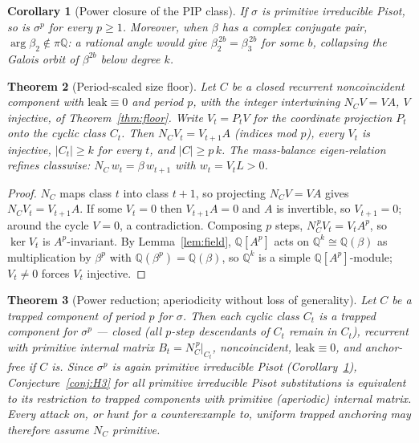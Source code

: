 \documentclass[11pt]{article}
\newtheorem{theorem}{Theorem}[section]
\newtheorem{corollary}[theorem]{Corollary}
\begin{document}
\begin{corollary}[Power closure of the PIP class]\label{cor:power}
If $\sigma$ is primitive irreducible Pisot, so is $\sigma^p$ for every
$p\ge1$. Moreover, when $\beta$ has a complex conjugate pair,
$\arg\beta_2\notin\pi\mathbb{Q}$: a rational angle would give
$\beta_2^{\,2b}=\beta_3^{\,2b}$ for some $b$, collapsing the Galois
orbit of $\beta^{2b}$ below degree $k$.
\end{corollary}

\begin{theorem}[Period-scaled size floor]\label{thm:periodfloor}
Let $C$ be a closed recurrent noncoincident component with
$\mathrm{leak}\equiv0$ and period $p$, with the integer intertwining
$N_CV=VA$, $V$ injective, of Theorem~\ref{thm:floor}. Write
$V_t=P_tV$ for the coordinate projection $P_t$ onto the cyclic class
$C_t$. Then $N_CV_t=V_{t+1}A$ (indices mod $p$), every $V_t$ is
injective, $|C_t|\ge k$ for every $t$, and $|C|\ge p\,k$. The
mass-balance eigen-relation refines classwise:
$N_C\,w_t=\beta\,w_{t+1}$ with $w_t=V_tL>0$.
\end{theorem}

\begin{proof}
$N_C$ maps class $t$ into class $t+1$, so projecting $N_CV=VA$ gives
$N_CV_t=V_{t+1}A$. If some $V_t=0$ then $V_{t+1}A=0$ and $A$ is
invertible, so $V_{t+1}=0$; around the cycle $V=0$, a contradiction.
Composing $p$ steps, $N_C^{\,p}V_t=V_tA^p$, so $\ker V_t$ is
$A^p$-invariant. By Lemma~\ref{lem:field}, $\mathbb{Q}[A^p]$ acts on
$\mathbb{Q}^k\cong\mathbb{Q}(\beta)$ as multiplication by $\beta^p$
with $\mathbb{Q}(\beta^p)=\mathbb{Q}(\beta)$, so $\mathbb{Q}^k$ is a
simple $\mathbb{Q}[A^p]$-module; $V_t\ne0$ forces $V_t$ injective.
\end{proof}

\begin{theorem}[Power reduction; aperiodicity without loss of
generality]\label{thm:powerred}
Let $C$ be a trapped component of period $p$ for $\sigma$. Then each
cyclic class $C_t$ is a trapped component for $\sigma^p$ --- closed
(all $p$-step descendants of $C_t$ remain in $C_t$), recurrent with
\emph{primitive} internal matrix $B_t=N_C^{\,p}|_{C_t}$, noncoincident,
$\mathrm{leak}\equiv0$, and anchor-free if $C$ is. Since $\sigma^p$ is
again primitive irreducible Pisot (Corollary~\ref{cor:power}),
Conjecture~\ref{conj:H3} for all primitive irreducible Pisot
substitutions is equivalent to its restriction to trapped components
with primitive (aperiodic) internal matrix. Every attack on, or hunt
for a counterexample to, uniform trapped anchoring may therefore assume
$N_C$ primitive.
\end{theorem}
\end{document}
